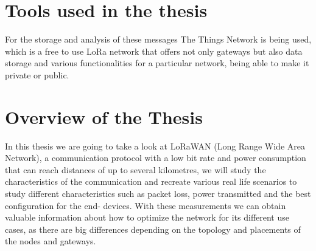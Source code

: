 \section{Tools used in the thesis}
\label{objectives}
For the storage and analysis of these messages The Things Network is
being used, which is a free to use LoRa network that offers not only
gateways but also data storage and various functionalities for a
particular network, being able to make it private or public.

\section{Overview of the Thesis}
\label{overview}
In this thesis we are going to take a look at LoRaWAN (Long Range
Wide Area Network), a communication protocol with a low bit rate and
power consumption that can reach distances of up to several kilometres,
we will study the characteristics of the communication and recreate
various real life scenarios to study different characteristics such as
packet loss, power transmitted and the best configuration for the end-
devices. With these measurements we can obtain valuable information
about how to optimize the network for its different use cases, as there
are big differences depending on the topology and placements of the
nodes and gateways.